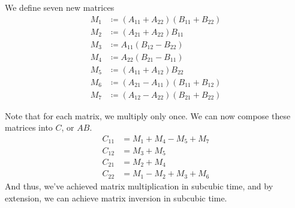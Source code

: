 \documentclass[12pt, letterpaper]{article}
\theoremstyle{remark}
\theoremstyle{remark}
\begin{document}
    We define seven new matrices
    \begin{align*}
        M_1 &\coloneqq (A_{11} + A_{22})(B_{11} + B_{22}) \\
        M_2 &\coloneqq (A_{21} + A_{22})B_{11} \\
        M_3 &\coloneqq A_{11}(B_{12} - B_{22}) \\
        M_4 &\coloneqq A_{22}(B_{21} - B_{11}) \\
        M_5 &\coloneqq (A_{11} + A_{12})B_{22} \\
        M_6 &\coloneqq (A_{21} - A_{11})(B_{11} + B_{12}) \\
        M_7 &\coloneqq (A_{12} - A_{22})(B_{21} + B_{22})
    \end{align*}

    Note that for each matrix, we multiply only once. We can 
    now compose these matrices into \(C\), or \(AB\).
    \begin{align*}
        C_{11} &= M_1 + M_4 - M_5 + M_7 \\
        C_{12} &= M_3 + M_5 \\
        C_{21} &= M_2 + M_4 \\
        C_{22} &= M_1 - M_2 + M_3 + M_6
    \end{align*}
    And thus, we've achieved matrix multiplication in subcubic time,
    and by extension, we can achieve matrix inversion in subcubic time.
\end{document}

